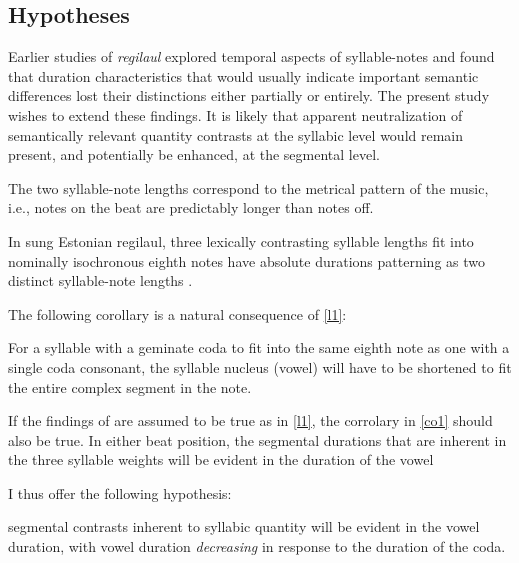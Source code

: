 %

\subsection{Hypotheses}
Earlier studies of {\it regilaul} explored temporal aspects of syllable-notes and found that duration characteristics that would usually indicate important semantic differences lost their distinctions either partially or entirely. The present study wishes to extend these findings. It is likely that apparent neutralization of semantically relevant quantity contrasts at the syllabic level would remain present, and potentially be enhanced, at the segmental level.


The two syllable-note lengths correspond to the metrical pattern of the music, i.e., notes on the beat are predictably longer than notes off. 


\begin{lem}
\label{l1}
 In sung Estonian regilaul, three lexically contrasting syllable lengths fit into nominally isochronous eighth notes have absolute durations patterning as two distinct syllable-note lengths  \citep{rossLehiste2001}.
\end{lem}
The following corollary is a natural consequence of \ref{l1}: 
\begin{cor} 
\label{cor1}
For a syllable with a geminate coda to fit into the same eighth note as one with a single coda consonant, the syllable nucleus (vowel) will have to be shortened to fit the entire complex segment in the note. 
\end{cor} 
If the findings of \citep{rossLehiste2001} are assumed to be true as in \ref{l1}, the corrolary in \ref{co1} should also be true. 
In either beat position, the segmental durations that are inherent in the three syllable weights will be evident in the duration of the vowel 

I thus offer the following hypothesis: 

\begin{hyp}
\label{qhypo}
segmental contrasts inherent to syllabic quantity will be evident in the vowel duration, with vowel duration {\it decreasing} in response to the duration of the coda. \\


\end{hyp}


